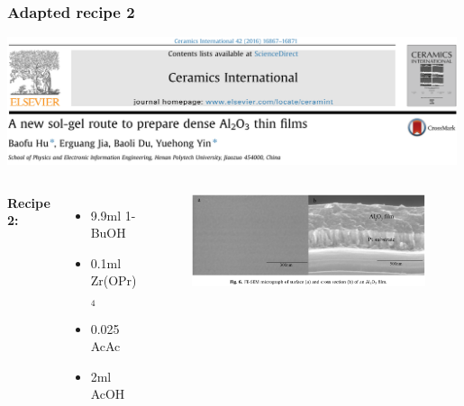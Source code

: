 \documentclass{beamer}
\begin{document}
\begin{frame}[t]
	\frametitle{Adapted recipe 2}
	\includegraphics[width=0.99\textwidth]{Images/a2o3.png}
	\begin{columns}[t]
			\textbf{Recipe 2:}
			\begin{itemize}
				\item 9.9ml 1-BuOH
				\item 0.1ml Zr(OPr)$_4$
				\item 0.025 AcAc
				\item 2ml AcOH
			\end{itemize}
			\begin{figure}
				\includegraphics[width=\textwidth]{Images/nocracks.png}
			\end{figure}
			\vfill

	\end{columns}
\end{frame}
\end{document}
